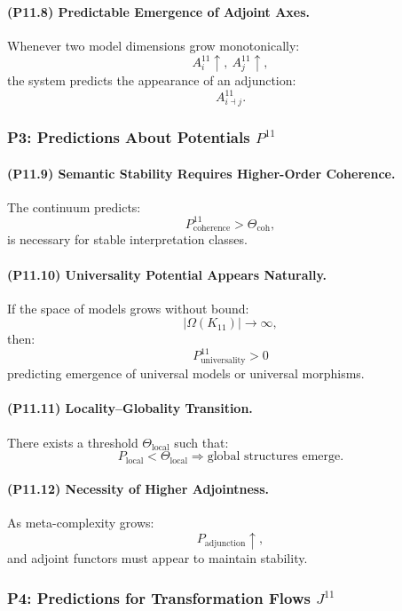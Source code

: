 \paragraph{(P11.8) Predictable Emergence of Adjoint Axes.}
Whenever two model dimensions grow monotonically:
\[
A_i^{11} \uparrow,\ 
A_j^{11} \uparrow,
\]
the system predicts the appearance of an adjunction:
\[
A_{i \dashv j}^{11}.
\]

\subsubsection{P3: Predictions About Potentials $P^{11}$}

\paragraph{(P11.9) Semantic Stability Requires Higher-Order Coherence.}
The continuum predicts:
\[
P_{\mathrm{coherence}}^{11} > \Theta_{\mathrm{coh}},
\]
is necessary for stable interpretation classes.

\paragraph{(P11.10) Universality Potential Appears Naturally.}
If the space of models grows without bound:
\[
|\Omega(K_{11})| \to \infty,
\]
then:
\[
P_{\mathrm{universality}}^{11} > 0
\]
predicting emergence of universal models or universal morphisms.

\paragraph{(P11.11) Locality–Globality Transition.}
There exists a threshold $\Theta_{\mathrm{local}}$ such that:
\[
P_{\mathrm{local}} < \Theta_{\mathrm{local}}
\Rightarrow 
\text{global structures emerge}.
\]

\paragraph{(P11.12) Necessity of Higher Adjointness.}
As meta-complexity grows:
\[
P_{\mathrm{adjunction}} \uparrow,
\]
and adjoint functors must appear to maintain stability.

\subsubsection{P4: Predictions for Transformation Flows $J^{11}$}

